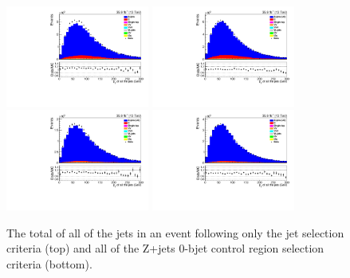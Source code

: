 \begin{figure}[ht]
\centering
\includegraphics[width=0.42\textwidth]{figs/background-estimation/plots/unblinded/DY_control_old_prompt_ee_ttbarInc/totalJetPt_SingleTop_jetSel_ee.pdf}
\includegraphics[width=0.42\textwidth]{figs/background-estimation/plots/unblinded/DY_control_old_prompt_mumu_ttbarInc/totalJetPt_SingleTop_jetSel_mumu.pdf}
\\
\includegraphics[width=0.42\textwidth]{figs/background-estimation/plots/unblinded/DY_control_old_prompt_ee_ttbarInc/totalJetPt_SingleTop_wMass_ee.pdf}
\includegraphics[width=0.42\textwidth]{figs/background-estimation/plots/unblinded/DY_control_old_prompt_mumu_ttbarInc/totalJetPt_SingleTop_wMass_mumu.pdf}
\caption{
The total \pT of all of the jets in an event following only the jet selection criteria (top) and all of the Z+jets 0-bjet control region selection criteria (bottom).
}
\label{fig:App_CR_LO_totalJetPt}
\end{figure}

